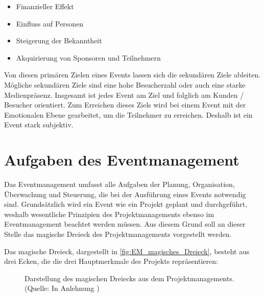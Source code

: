 \begin{itemize}
    \item Finanzieller Effekt
    \item Einfluss auf Personen
    \item Steigerung der Bekanntheit
    \item Akquirierung von Sponsoren und Teilnehmern
\end{itemize}

Von diesen primären Zielen eines Events lassen sich die sekundären Ziele ableiten. Mögliche sekundären Ziele sind eine hohe Besucherzahl oder auch eine starke Medienpräsenz. Insgesamt ist jedes Event am Ziel und folglich am Kunden / Besucher orientiert. Zum Erreichen dieses Ziels wird bei einem Event mit der Emotionalen Ebene gearbeitet, um die Teilnehmer zu erreichen. Deshalb ist ein Event stark subjektiv.\autocite[Vgl.][S. 6 ff.]{Holzbaur.2002}

\section{Aufgaben des Eventmanagement}
Das Eventmanagement umfasst alle Aufgaben der Planung, Organisation, Überwachung und Steuerung, die bei der Ausführung eines Events notwendig sind. Grundsätzlich wird ein Event wie ein Projekt geplant und durchgeführt, weshalb wesentliche Prinzipien des Projektmanagements ebenso im Eventmanagement beachtet werden müssen. Aus diesem Grund soll an dieser Stelle das magische Dreieck des Projektmanagements vorgestellt werden.\autocite[Vgl.][S. 22]{Holzbaur.2002}

Das magische Dreieck, dargestellt in \autoref{fig:EM_magisches_Dreieck}, besteht aus drei Ecken, die die drei Hauptmerkmale des Projekts repräsentieren:

\begin{figure}[H]
    \centering
    \setlength{\fboxsep}{10pt}
    \setlength{\fboxrule}{0.5pt}
    \caption[Eventmanagement: magisches Dreieck]{Darstellung des magischen Dreiecks aus dem Projektmanagements. (Quelle: In Anlehnung \autocite[]{Holzbaur.2002})} \label{fig:EM_magisches_Dreieck}
\end{figure}

